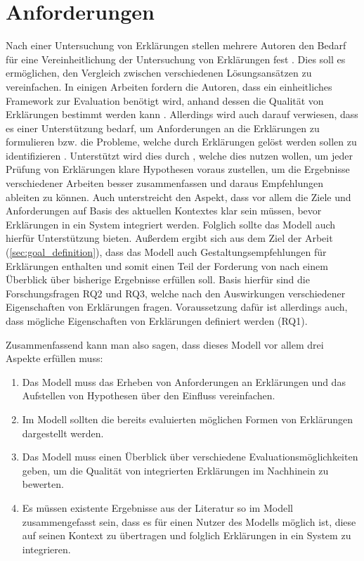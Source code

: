 \section{Anforderungen}

Nach einer Untersuchung von Erklärungen stellen mehrere Autoren den Bedarf für eine Vereinheitlichung der Untersuchung von Erklärungen fest \cite{cirqueira_scenario-based_2020,zahedi_towards_2019, nunes_systematic_2017, martin_evaluating_2021}. Dies soll es ermöglichen, den Vergleich zwischen verschiedenen Lösungsansätzen zu vereinfachen. In einigen Arbeiten fordern die Autoren, dass ein einheitliches Framework zur Evaluation benötigt wird, anhand dessen die Qualität von Erklärungen bestimmt werden kann \cite{nunes_systematic_2017,sokol_explainability_2020,chari_explanation_2020}. Allerdings wird auch darauf verwiesen, dass es einer Unterstützung bedarf, um Anforderungen an die Erklärungen zu formulieren bzw. die Probleme, welche durch Erklärungen gelöst werden sollen zu identifizieren \cite{chazette_end-users_nodate, doshi2017towards}. Unterstützt wird dies durch \citeauthor{waa_evaluating_2021}, welche dies nutzen wollen, um jeder Prüfung von Erklärungen klare Hypothesen voraus zustellen, um die Ergebnisse verschiedener Arbeiten besser zusammenfassen und daraus Empfehlungen ableiten zu können. Auch \citeauthor{kohl_explainability_2019} unterstreicht den Aspekt, dass vor allem die Ziele und Anforderungen auf Basis des aktuellen Kontextes klar sein müssen, bevor Erklärungen in ein System integriert werden. Folglich sollte das Modell auch hierfür Unterstützung bieten. Außerdem ergibt sich aus dem Ziel der Arbeit (\autoref{sec:goal_definition}), dass das Modell auch Gestaltungsempfehlungen für Erklärungen enthalten und somit einen Teil der Forderung von \citeauthor{waa_evaluating_2021} nach einem Überblick über bisherige Ergebnisse erfüllen soll. Basis hierfür sind die Forschungsfragen RQ2 und RQ3, welche nach den Auswirkungen verschiedener Eigenschaften von Erklärungen fragen. Voraussetzung dafür ist allerdings auch, dass mögliche Eigenschaften von Erklärungen definiert werden (RQ1).

Zusammenfassend kann man also sagen, dass dieses Modell vor allem drei Aspekte erfüllen muss:

\begin{enumerate}
    \item Das Modell muss das Erheben von Anforderungen an Erklärungen und das Aufstellen von Hypothesen über den Einfluss vereinfachen.
    \item Im Modell sollten die bereits evaluierten möglichen Formen von Erklärungen dargestellt werden.
    \item Das Modell muss einen Überblick über verschiedene Evaluationsmöglichkeiten geben, um die Qualität von integrierten Erklärungen im Nachhinein zu bewerten.
    \item Es müssen existente Ergebnisse aus der Literatur so im Modell zusammengefasst sein, dass es für einen Nutzer des Modells möglich ist, diese auf seinen Kontext zu übertragen und folglich Erklärungen in ein System zu integrieren.
\end{enumerate}